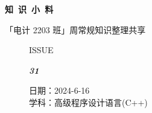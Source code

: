 \documentclass[UTF8]{ctexart}
\newcommand\Black[1]{\textcolor[gray]{0.3}{#1}}
\newcommand\Brown[1]{\textcolor[HTML]{998A4E}{#1}}
\newcommand\IssueNumber{31}
\newcommand\Date{2024-6-16}
\newcommand\Subject{高级程序设计语言(C++)}
\begin{document}
\BgThispage
\begin{center}
\phantom{...}

{\Large\textcolor{brown!40!white}{}}

\vspace{-2em}

{\Huge\bfseries\TitleFont \Black{知\ 识\ 小\ 料}}


\vspace{-0.1cm}
{\footnotesize \Brown{「电计 2203 班」周常规知识整理共享}}
\end{center}

\vspace{-0.5cm}


\begin{figure}[H]
\hspace{1cm}
\begin{minipage}[t]{0.3\textwidth}
\centering
    \Brown{\Genshin ISSUE}

    \vspace{-0.6cm}
    \Huge \Issue\slshape\bfseries\Black{\IssueNumber}
\end{minipage}
\hfill
\begin{minipage}[t]{0.35\textwidth}
\centering
    \Brown{日期：\Date} \\
\vspace{-0.1cm}
    \Brown{学科：\Subject} \\
\end{minipage}
\hspace{0.8cm}
\end{figure}
\end{document}
